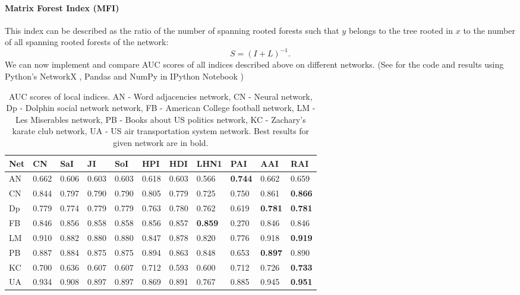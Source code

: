 \documentclass{llncs}
\begin{document}
\paragraph{Matrix Forest Index (MFI) \cite{mf-index}}
%
This index can be described as the ratio of the number of spanning rooted forests such that $y$ belongs to the tree rooted in $x$ to the number of all spanning rooted forests of the network:
\begin{equation}
S = (I + L)^{-1}.
\end{equation}
%
We can now implement and compare AUC scores of all indices described above on different networks. (See \cite{ipynb-auc} for the code and results using Python's NetworkX \cite{networkx}, Pandas \cite{pandas} and NumPy \cite{numpy} in IPython Notebook \cite{ipython})
%
\setlength{\tabcolsep}{5pt}
\renewcommand{\arraystretch}{1.5}
\begin{table}
\begin{center}
\caption{AUC scores of local indices. AN - Word adjacencies network\cite{adjnoun-net}, CN - Neural network\cite{celneur-net}, Dp - Dolphin social network network\cite{dolph-net}, FB - American College football network\cite{foot-net}, LM - Les Miserables network\cite{lesmis-net}, PB - Books about US politics network\cite{polbook-net}, KC - Zachary's karate club network\cite{karate-net}, UA - US air transportation system network\cite{usair-net}. Best results for given network are in bold.}
\begin{tabular}{| l | l | l | l | l | l | l | l | l | l | l |}
\hline
Net & CN & SaI & JI & SoI & HPI & HDI & LHN1 & PAI & AAI & RAI \\ \hline
AN & 0.662 & 0.606 & 0.603 & 0.603 & 0.618 & 0.603 & 0.566 & \textbf{0.744} & 0.662 & 0.659 \\ \hline
CN & 0.844 & 0.797 & 0.790 & 0.790 & 0.805 & 0.779 & 0.725 & 0.750 & 0.861 & \textbf{0.866} \\ \hline
Dp & 0.779 & 0.774 & 0.779 & 0.779 & 0.763 & 0.780 & 0.762 & 0.619 & \textbf{0.781} & \textbf{0.781} \\ \hline
FB & 0.846 & 0.856 & 0.858 & 0.858 & 0.856 & 0.857 & \textbf{0.859} & 0.270 & 0.846 & 0.846 \\ \hline
LM & 0.910 & 0.882 & 0.880 & 0.880 & 0.847 & 0.878 & 0.820 & 0.776 & 0.918 & \textbf{0.919} \\ \hline
PB & 0.887 & 0.884 & 0.875 & 0.875 & 0.894 & 0.863 & 0.848 & 0.653 & \textbf{0.897} & 0.890 \\ \hline
KC & 0.700 & 0.636 & 0.607 & 0.607 & 0.712 & 0.593 & 0.600 & 0.712 & 0.726 & \textbf{0.733} \\ \hline
UA & 0.934 & 0.908 & 0.897 & 0.897 & 0.869 & 0.891 & 0.767 & 0.885 & 0.945 & \textbf{0.951} \\ 
\hline
\end{tabular}
\end{center}
\end{table}
\end{document}
